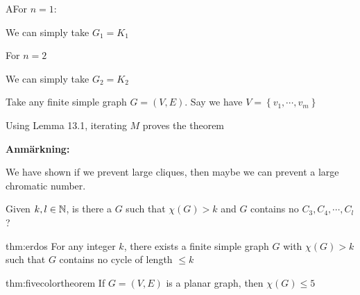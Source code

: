 \par\bigskip
\begin{prf}
  AFor $n=1$:\par
  We can simply take $G_1 = K_1$
  \par\bigskip
  \noindent For $n=2$\par
  We can simply take $G_2 = K_2$
  \par\bigskip
  \noindent Take any finite simple graph $G = (V,E)$. Say we have $V =  \left\{v_1,\cdots,v_m\right\}$
  \par\bigskip
  \noindent Using Lemma 13.1, iterating $M$ proves the theorem
\end{prf}
\par\bigskip
\noindent\textbf{Anmärkning:}\par
\noindent We have shown if we prevent large cliques, then maybe we can prevent a large chromatic number.
\par\bigskip
\noindent Given $k,l\in\mathbb{N}$, is there a $G$ such that $\chi(G)>k$ and $G$ contains no $C_3,C_4,\cdots,C_l$?
\par\bigskip
\begin{theo}[Erdös]{thm:erdos}
  For any integer $k$, there exists a finite simple graph $G$ with $\chi(G)>k$ such that $G$ contains no cycle of length $\leq k$ 
\end{theo}
\newpage
\begin{theo}[Heawood]{thm:fivecolortheorem}
  If $G = (V,E)$ is a planar graph, then $\chi(G)\leq5$
\end{theo}
\par\bigskip
